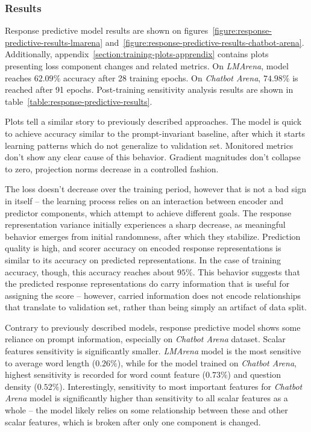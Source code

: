 \documentclass[a4paper,11pt,twoside]{report}
\theoremstyle{definition}
\begin{document}
\subsubsection{Results}

Response predictive model results are shown on figures~\ref{figure:response-predictive-results-lmarena} and~\ref{figure:response-predictive-results-chatbot-arena}. Additionally, appendix~\ref{section:training-plots-apprendix} contains plots presenting loss component changes and related metrics. On \textit{LMArena}, model reaches $62.09 \%$ accuracy after 28 training epochs. On \textit{Chatbot Arena}, $74.98 \%$ is reached after 91 epochs. Post-training sensitivity analysis results are shown in table~\ref{table:response-predictive-results}.

Plots tell a similar story to previously described approaches. The model is quick to achieve accuracy similar to the prompt-invariant baseline, after which it starts learning patterns which do not generalize to validation set. Monitored metrics don't show any clear cause of this behavior. Gradient magnitudes don't collapse to zero, projection norms decrease in a controlled fashion. 

The loss doesn't decrease over the training period, however that is not a bad sign in itself -- the learning process relies on an interaction between encoder and predictor components, which attempt to achieve different goals. The response representation variance initially experiences a sharp decrease, as meaningful behavior emerges from initial randomness, after which they stabilize. Prediction quality is high, and scorer accuracy on encoded response representations is similar to its accuracy on predicted representations. In the case of training accuracy, though, this accuracy reaches about $95 \%$. This behavior suggests that the predicted response representations do carry information that is useful for assigning the score -- however, carried information does not encode relationships that translate to validation set, rather than being simply an artifact of data split. 

Contrary to previously described models, response predictive model shows some reliance on prompt information, especially on \textit{Chatbot Arena} dataset. Scalar features sensitivity is significantly smaller. \textit{LMArena} model is the most sensitive to average word length ($0.26 \%$), while for the model trained on \textit{Chatbot Arena}, highest sensitivity is recorded for word count feature ($0.73 \%$) and question density ($0.52 \%$). Interestingly, sensitivity to most important features for \textit{Chatbot Arena} model is significantly higher than sensitivity to all scalar features as a whole -- the model likely relies on some relationship between these and other scalar features, which is broken after only one component is changed.
\end{document}
